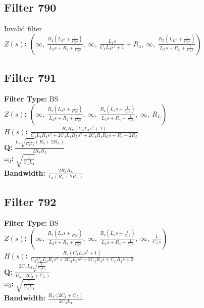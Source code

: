 \documentclass{article}
\begin{document}
\subsection*{Filter 790}
Invalid filter \\ 
\textbf{$Z(s)$:} $\left( \infty, \  \frac{R_{2} \left(L_{2} s + \frac{1}{C_{2} s}\right)}{L_{2} s + R_{2} + \frac{1}{C_{2} s}}, \  \infty, \  \frac{L_{4} s}{C_{4} L_{4} s^{2} + 1} + R_{4}, \  \infty, \  \frac{R_{L} \left(L_{L} s + \frac{1}{C_{L} s}\right)}{L_{L} s + R_{L} + \frac{1}{C_{L} s}}\right)$ \\ 
\subsection*{Filter 791}
\textbf{Filter Type:} BS \\ 
\textbf{$Z(s)$:} $\left( \infty, \  \frac{R_{2} \left(L_{2} s + \frac{1}{C_{2} s}\right)}{L_{2} s + R_{2} + \frac{1}{C_{2} s}}, \  \infty, \  \frac{R_{4} \left(L_{4} s + \frac{1}{C_{4} s}\right)}{L_{4} s + R_{4} + \frac{1}{C_{4} s}}, \  \infty, \  R_{L}\right)$ \\ 
\textbf{$H(s)$:} $\frac{R_{4} R_{L} \left(C_{4} L_{4} s^{2} + 1\right)}{C_{4} L_{4} R_{4} s^{2} + 2 C_{4} L_{4} R_{L} s^{2} + 2 C_{4} R_{4} R_{L} s + R_{4} + 2 R_{L}}$ \\ 
\textbf{Q:} $\frac{L_{4} \sqrt{\frac{1}{C_{4} L_{4}}} \left(R_{4} + 2 R_{L}\right)}{2 R_{4} R_{L}}$ \\ 
\textbf{$\omega_0$:} $\sqrt{\frac{1}{C_{4} L_{4}}}$ \\ 
\textbf{Bandwidth:} $\frac{2 R_{4} R_{L}}{L_{4} \left(R_{4} + 2 R_{L}\right)}$ \\ 
\subsection*{Filter 792}
\textbf{Filter Type:} BS \\ 
\textbf{$Z(s)$:} $\left( \infty, \  \frac{R_{2} \left(L_{2} s + \frac{1}{C_{2} s}\right)}{L_{2} s + R_{2} + \frac{1}{C_{2} s}}, \  \infty, \  \frac{R_{4} \left(L_{4} s + \frac{1}{C_{4} s}\right)}{L_{4} s + R_{4} + \frac{1}{C_{4} s}}, \  \infty, \  \frac{1}{C_{L} s}\right)$ \\ 
\textbf{$H(s)$:} $\frac{R_{4} \left(C_{4} L_{4} s^{2} + 1\right)}{C_{4} C_{L} L_{4} R_{4} s^{3} + 2 C_{4} L_{4} s^{2} + 2 C_{4} R_{4} s + C_{L} R_{4} s + 2}$ \\ 
\textbf{Q:} $\frac{2 C_{4} L_{4} \sqrt{\frac{1}{C_{4} L_{4}}}}{R_{4} \left(2 C_{4} + C_{L}\right)}$ \\ 
\textbf{$\omega_0$:} $\sqrt{\frac{1}{C_{4} L_{4}}}$ \\ 
\textbf{Bandwidth:} $\frac{R_{4} \left(2 C_{4} + C_{L}\right)}{2 C_{4} L_{4}}$ \\ 
\end{document}
